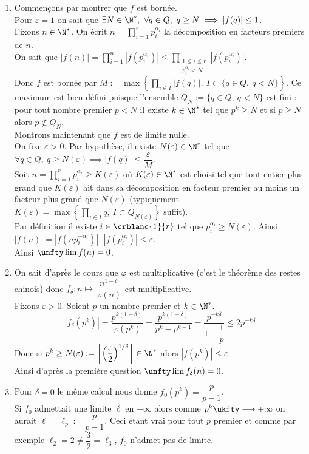 \documentclass[8pt]{book}
\begin{document}
	\begin{enumerate}[leftmargin=*]
		\item Commençons par montrer que $f$ est bornée.\\
		Pour $\varepsilon=1$ on sait que $\exists N\in \N^*,\ \forall q\in Q,\ q\geq N\implies |f(q)|\leq 1$.\\
		Fixons $n\in \N^*$. On écrit $n=\displaystyle\prod_{i=1}^rp_i^{\alpha_i}$ la décomposition en facteurs premiers de $n$.\\
		On sait que $|f(n)|=\displaystyle\prod_{i=1}^n|f(p_i^{\alpha_i})|\leq \prod_{\substack{1\leq i\leq r\\p_i^{\alpha_i}<N}}|f(p_i^{\alpha_i})|$.\\
		Donc $f$ est bornée par $M:=\displaystyle\max\left\{\prod_{i\in I}|f(q)|,\ I\subset\{q\in Q,\ q<N\}\right\}$. Ce maximum est bien défini puisque l'ensemble $Q_N:=\{q\in Q,\ q<N\}$ est fini : pour tout nombre premier $p<N$ il existe $k\in \N^*$ tel que $p^k\geq N$ et si $p\geq N$ alors $p\notin Q_N$.\\
		Montrons maintenant que $f$ est de limite nulle.\\
		On fixe $\varepsilon>0$. Par hypothèse, il existe $N(\varepsilon)\in \N^*$ tel que $\forall q\in Q,\ q\geq N(\varepsilon)\implies |f(q)|\leq \dfrac{\varepsilon}{M}$.\\
		Soit $n=\displaystyle\prod_{i=1}^rp_i^{\alpha_i}\geq K(\varepsilon)$ où $K(\varepsilon)\in \N^*$ est choisi tel que tout entier plus grand que $K(\varepsilon)$ ait dans sa décomposition en facteur premier au moins un facteur plus grand que $N(\varepsilon)$ (typiquement $K(\varepsilon)=\max\left\{\displaystyle\prod_{i\in I}q,\ I\subset Q_{N(\varepsilon)}\right\}$ suffit).\\
		Par définition il existe $i\in \crblanc{1}{r}$ tel que $p_i^{\alpha_i}\geq N(\varepsilon)$. Ainsi $|f(n)|=|f(np_i^{-\alpha_i})|\cdot|f(p_i^{\alpha_i})|\leq \varepsilon$.\\
		Ainsi $\unfty\lim f(n)=0$.
		\item On sait d'après le cours que $\varphi$ est multiplicative (c'est le théorème des restes chinois) donc $f_\delta : n\mapsto \dfrac{n^{1-\delta}}{\varphi(n)}$ est multiplicative.\\
		Fixons $\varepsilon>0$. Soient $p$ un nombre premier et $k\in \N^*$.
		$$|f_\delta(p^k)|=\frac{p^{k(1-\delta)}}{\varphi(p^k)}=\frac{p^{k(1-\delta)}}{p^k-p^{k-1}}=\frac{p^{-k\delta}}{1-\dfrac{1}{p}}\leq 2p^{-k\delta}$$
		Donc si $p^k\geq N(\varepsilon):=\left\lceil\left(\dfrac{\varepsilon}{2}\right)^{1/\delta}\right\rceil\in \N^*$ alors $|f(p^k)|\leq \varepsilon$.\\
		Ainsi d'après la première question $\unfty\lim f_\delta(n)=0$.
		\item Pour $\delta=0$ le même calcul nous donne $f_0(p^k)=\dfrac{p}{p-1}$.\\
		Si $f_0$ admettait une limite $\ell$ en $+\infty$ alors comme $p^k\ukfty\longrightarrow +\infty$ on aurait $\ell=\ell_p:=\dfrac{p}{p-1}$. Ceci étant vrai pour tout $p$ premier et comme par exemple $\ell_2=2\ne \dfrac{3}{2}=\ell_3$, $f_0$ n'admet pas de limite.
	\end{enumerate}
	
\end{document}
